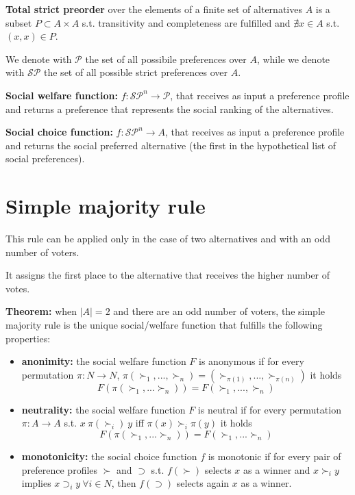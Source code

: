 \bigskip
\noindent \textbf{Total strict preorder} over the elements of a finite set of alternatives $A$ is a subset $P \subset A \times A$ s.t. transitivity and completeness are fulfilled and $\nexists x \in A$ s.t. $(x,x) \in P$.

\bigskip 
\noindent We denote with $\mathcal{P}$ the set of all possibile preferences over $A$, while we denote with $\mathcal{SP}$ the set of all possible strict preferences over $A$.

\bigskip
\noindent \textbf{Social welfare function:} $f: \mathcal{SP}^n \rightarrow \mathcal{P}$, that receives as input a preference profile and returns a preference that represents the social ranking of the alternatives.

\bigskip
\noindent \textbf{Social choice function:} $f: \mathcal{SP}^n \rightarrow A$, that receives as input a preference profile and returns the social preferred alternative (the first in the hypothetical list of social preferences).

\section{Simple majority rule}

\noindent This rule can be applied only in the case of two alternatives and with an odd number of voters.

\noindent It assigns the first place to the alternative that receives the higher number of votes.

\bigskip
\noindent \textbf{Theorem:} when $|A| = 2$ and there are an odd number of voters, the simple majority rule is the unique social/welfare function that fulfills the following properties:
\begin{itemize}
	\item \textbf{anonimity:} the social welfare function $F$ is anonymous if for every permutation $\pi: N \rightarrow N$, $\pi(\succ_1,...,\succ_n) = (\succ_{\pi(1)},...,\succ_{\pi(n)})$ it holds 
	\[
		F(\pi(\succ_1,...\succ_n)) = F(\succ_1,...,\succ_n)
	\]
	
	\item \textbf{neutrality:} the social welfare function $F$ is neutral if for every permutation $\pi: A \rightarrow A$ s.t. $x~ \pi(\succ_i)~ y$ iff $\pi(x) \succ_i \pi(y)$ it holds
	\[
		F(\pi(\succ_1,...\succ_n)) = F(\succ_1,...\succ_n)
	\]
	
	\item \textbf{monotonicity:} the social choice function $f$ is monotonic if for every pair of preference profiles $\succ$ and $\supset$ s.t. $f(\succ)$ selects $x$ as a winner and $x \succ_i y$ implies $x \supset_i y ~\forall i \in N$, then $f(\supset)$ selects again $x$ as a winner.
\end{itemize}

